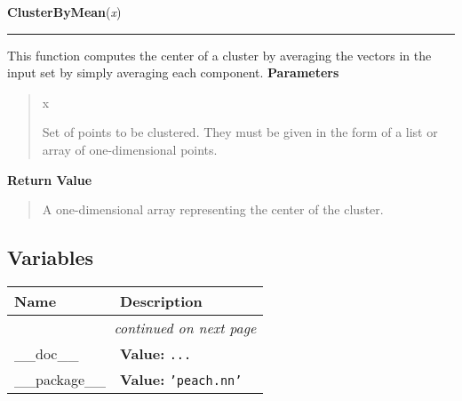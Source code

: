 \hspace{.8\funcindent}\begin{boxedminipage}{\funcwidth}

    \raggedright \textbf{ClusterByMean}(\textit{x})

    \vspace{-1.5ex}

    \rule{\textwidth}{0.5\fboxrule}
\setlength{\parskip}{2ex}

This function computes the center of a cluster by averaging the vectors in
the input set by simply averaging each component.
\setlength{\parskip}{1ex}
      \textbf{Parameters}
      \vspace{-1ex}

      \begin{quote}
        \begin{Ventry}{x}

          \item[x]


Set of points to be clustered. They must be given in the form of a list
or array of one-dimensional points.
        \end{Ventry}

      \end{quote}

      \textbf{Return Value}
    \vspace{-1ex}

      \begin{quote}

A one-dimensional array representing the center of the cluster.
      \end{quote}

    \end{boxedminipage}



  \subsection{Variables}

    \vspace{-1cm}
\hspace{\varindent}\begin{longtable}{|p{\varnamewidth}|p{\vardescrwidth}|l}
\cline{1-2}
\cline{1-2} \centering \textbf{Name} & \centering \textbf{Description}& \\
\cline{1-2}
\endhead\cline{1-2}\multicolumn{3}{r}{\small\textit{continued on next page}}\\\endfoot\cline{1-2}
\endlastfoot\raggedright \_\-\_\-d\-o\-c\-\_\-\_\- & \raggedright \textbf{Value:} 
{\tt \texttt{...}}&\\
\cline{1-2}
\raggedright \_\-\_\-p\-a\-c\-k\-a\-g\-e\-\_\-\_\- & \raggedright \textbf{Value:} 
{\tt \texttt{'}\texttt{peach.nn}\texttt{'}}&\\
\cline{1-2}
\end{longtable}


